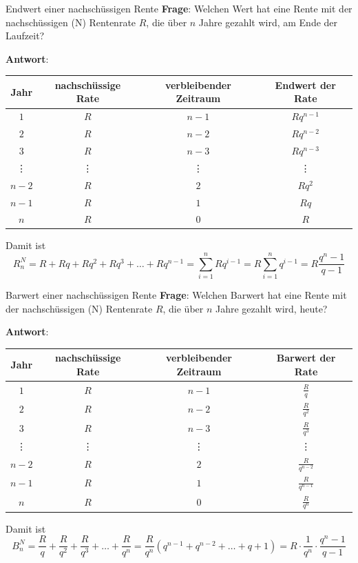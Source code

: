\begin{frame}{Endwert einer nachschüssigen Rente}
	\textbf{Frage}: Welchen Wert hat eine Rente mit der nachschüssigen (N) Rentenrate $R$, die über $n$ Jahre gezahlt wird, am Ende der Laufzeit?
	
	\footnotesize{
	\textbf{Antwort}: \begin{tabular}{|c|c|c|c|}
		\hline Jahr & nachschüssige Rate & verbleibender Zeitraum & Endwert der Rate \\ 
		\hline $1$ & $R$ & $n-1$ & $Rq^{n-1}$ \\ 
		\hline $2$ & $R$ & $n-2$ & $Rq^{n-2}$ \\ 
		\hline $3$ & $R$ & $n-3$ & $Rq^{n-3}$ \\ 
		\hline \vdots & \vdots & \vdots & \vdots \\ 
		\hline $n-2$ & $R$ & $2$ & $Rq^{2}$ \\ 
		\hline $n-1$ & $R$ & $1$ & $Rq$ \\ 
		\hline $n$ & $R$ & $0$ & $R$ \\ 
		\hline 
	\end{tabular}
	
	Damit ist
	\[
	R_{n}^{N} = R + Rq + Rq^{2} + R q^{3} + \ldots + Rq^{n-1} = \sum\limits_{i=1}^{n} Rq^{i-1} = R \sum\limits_{i=1}^{n} q^{i-1} = R \frac{q^{n}-1}{q-1}
	\] }
\end{frame}

\begin{frame}{Barwert einer nachschüssigen Rente}
	\textbf{Frage}: Welchen Barwert hat eine Rente mit der nachschüssigen (N) Rentenrate $R$, die über $n$ Jahre gezahlt wird, heute?
	
	\footnotesize{
		\textbf{Antwort}: \begin{tabular}{|c|c|c|c|}
			\hline Jahr & nachschüssige Rate & verbleibender Zeitraum & Barwert der Rate \\ 
			\hline $1$ & $R$ & $n-1$ & $\frac{R}{q}$ \\ 
			\hline $2$ & $R$ & $n-2$ & $\frac{R}{q^{2}}$ \\ 
			\hline $3$ & $R$ & $n-3$ & $\frac{R}{q^{3}}$ \\ 
			\hline \vdots & \vdots & \vdots & \vdots \\ 
			\hline $n-2$ & $R$ & $2$ & $\frac{R}{q^{n-2}}$ \\ 
			\hline $n-1$ & $R$ & $1$ & $\frac{R}{q^{n-1}}$ \\ 
			\hline $n$ & $R$ & $0$ & $\frac{R}{q^{n}}$ \\ 
			\hline 
		\end{tabular}
		
		Damit ist
		\[
		B_{n}^{N} = \frac{R}{q} + \frac{R}{q^{2}} + \frac{R}{q^{3}} + \ldots + \frac{R}{q^{n}} = \frac{R}{q^{n}} \left( q^{n-1} + q^{n-2} + \ldots + q + 1 \right) = R \cdot \frac{1}{q^{n}} \cdot \frac{q^n-1}{q-1}
		\]
	}
\end{frame}

